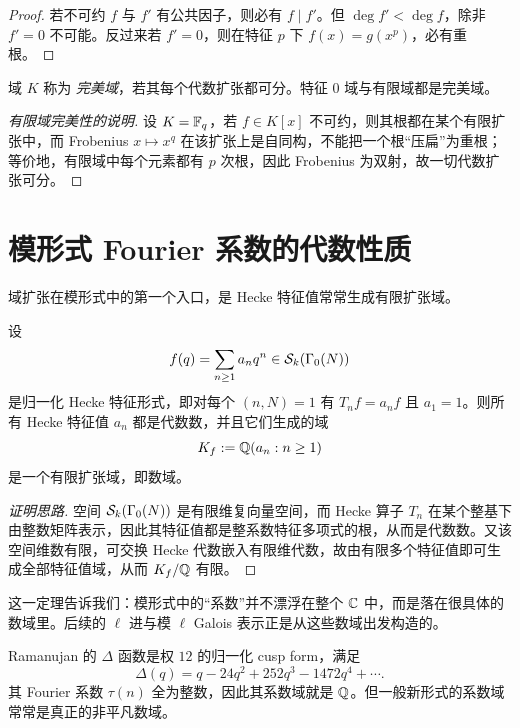 \begin{proof}
若不可约 $f$ 与 $f'$ 有公共因子，则必有 $f\mid f'$。但 $\deg f'<\deg f$，除非 $f'=0$ 不可能。反过来若 $f'=0$，则在特征 $p$ 下 $f(x)=g(x^p)$，必有重根。
\end{proof}

\begin{definition}
域 $K$ 称为 \emph{完美域}，若其每个代数扩张都可分。特征 $0$ 域与有限域都是完美域。
\end{definition}

\begin{proof}[有限域完美性的说明]
设 $K=\mathbb{F}_q$，若 $f\in K[x]$ 不可约，则其根都在某个有限扩张中，而 Frobenius $x\mapsto x^q$ 在该扩张上是自同构，不能把一个根“压扁”为重根；等价地，有限域中每个元素都有 $p$ 次根，因此 Frobenius 为双射，故一切代数扩张可分。
\end{proof}

\section{模形式 Fourier 系数的代数性质}

域扩张在模形式中的第一个入口，是 Hecke 特征值常常生成有限扩张域。

\begin{theorem}
设
\[
 f(q)=\sum_{n\ge 1} a_n q^n\in \mathcal{S}_k(\Gamma_0(N))
\]
是归一化 Hecke 特征形式，即对每个 $(n,N)=1$ 有 $T_n f=a_n f$ 且 $a_1=1$。则所有 Hecke 特征值 $a_n$ 都是代数数，并且它们生成的域
\[
 K_f:=\mathbb{Q}(a_n:n\ge 1)
\]
是一个有限扩张域，即数域。
\end{theorem}

\begin{proof}[证明思路]
空间 $\mathcal{S}_k(\Gamma_0(N))$ 是有限维复向量空间，而 Hecke 算子 $T_n$ 在某个整基下由整数矩阵表示，因此其特征值都是整系数特征多项式的根，从而是代数数。又该空间维数有限，可交换 Hecke 代数嵌入有限维代数，故由有限多个特征值即可生成全部特征值域，从而 $K_f/\mathbb{Q}$ 有限。
\end{proof}

\begin{remark}
这一定理告诉我们：模形式中的“系数”并不漂浮在整个 $\mathbb{C}$ 中，而是落在很具体的数域里。后续的 $\ell$ 进与模 $\ell$ Galois 表示正是从这些数域出发构造的。
\end{remark}

\begin{example}
Ramanujan 的 $\Delta$ 函数是权 $12$ 的归一化 cusp form，满足
\[
 \Delta(q)=q-24q^2+252q^3-1472q^4+\cdots.
\]
其 Fourier 系数 $\tau(n)$ 全为整数，因此其系数域就是 $\mathbb{Q}$。但一般新形式的系数域常常是真正的非平凡数域。
\end{example}

